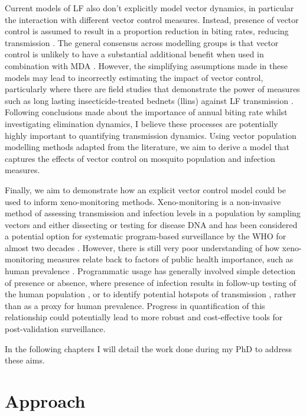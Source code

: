 Current models of LF also don't explicitly model vector dynamics, in particular the interaction with different vector control measures. Instead, presence of vector control is assumed to result in a proportion reduction in biting rates, reducing transmission \cite{irvine2015}. The general consensus across modelling groups is that vector control is unlikely to have a substantial additional benefit when used in combination with MDA \cite{Irvine2017_Tripledrug}. However, the simplifying assumptions made in these models may lead to incorrectly estimating the impact of vector control, particularly where there are field studies that demonstrate the power of measures such as long lasting insecticide-treated bednets (\acrshort{llins}) against LF transmission \cite{rebollo2015,Odermatt2008,Njenga2011,Blackburn2006}. Following conclusions made about the importance of annual biting rate whilst investigating elimination dynamics, I believe these processes are potentially highly important to quantifying transmission dynamics. Using vector population modelling methods adapted from the literature, we aim to derive a model that captures the effects of vector control on mosquito population and infection measures.

Finally, we aim to demonstrate how an explicit vector control model could be used to inform xeno-monitoring methods. Xeno-monitoring is a non-invasive method of assessing transmission and infection levels in a population by sampling vectors and either dissecting or testing for disease DNA and has been considered a potential option for systematic program-based surveillance by the WHO for almost two decades \cite{WHO2002xeno}. However, there is still very poor understanding of how xeno-monitoring measures relate back to factors of public health importance, such as human prevalence \cite{Schmaedick2014}. Programmatic usage has generally involved simple detection of presence or absence, where presence of infection results in follow-up testing of the human population \cite{Chadee2002,Rao2016}, or to identify potential hotspots of transmission \cite{Swaminathan2017}, rather than as a proxy for human prevalence. Progress in quantification of this relationship could potentially lead to more robust and cost-effective tools for post-validation surveillance.

In the following chapters I will detail the work done during my PhD to address these aims. 

\section{Approach}

